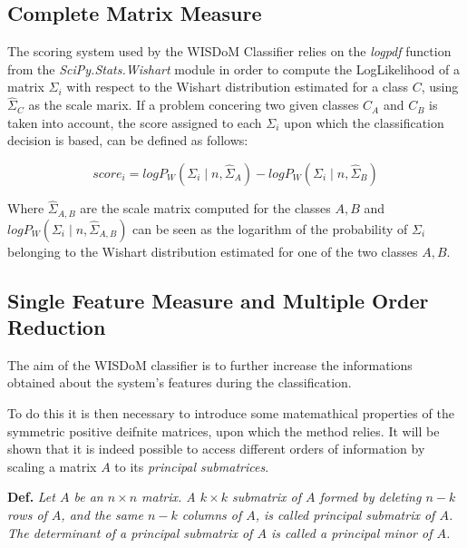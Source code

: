 \documentclass[12pt,openright,twoside,a4paper]{book}
\begin{document}
\subsection{Complete Matrix Measure}

The scoring system used by the WISDoM Classifier relies on the \textit{logpdf} function from the \textit{SciPy.Stats.Wishart} module in order to compute the LogLikelihood of a matrix $\Sigma_i$ with respect to the Wishart distribution estimated for a class $C$, using $\hat{\Sigma}_C$ as the scale marix.
If a problem concering two given classes $C_A$ and $C_B$ is taken into account, the score assigned to each $\Sigma_i$ upon which the classification decision is based, can be defined as follows:

\begin{equation}
score_{i}= logP_{W}(\Sigma_{i}\mid n, \hat{\Sigma}_{A})-logP_{W}(\Sigma_{i}\mid n,\hat{\Sigma}_{B})
\label{pdf-score}
\end{equation}

Where $\hat{\Sigma}_{A,B}$ are the scale matrix computed for the classes $A,B$ and $ logP_{W}(\Sigma_{i}\mid n, \hat{\Sigma}_{A,B})$ can be seen as the logarithm of the probability of $\Sigma_i$ belonging to the Wishart distribution estimated for one of the two classes $A,B$.

\subsection{Single Feature Measure and Multiple Order Reduction}

The aim of the WISDoM classifier is to further increase the informations obtained about the system's features during the classification.

To do this it is then necessary to introduce some matemathical properties of the symmetric positive deifnite matrices, upon which the method relies.
It will be shown that it is indeed possible to access different orders of information by scaling a matrix $A$ to its \textit{principal submatrices}.

\vspace{5mm}

\textbf{Def.} \textit{Let $A$ be an $n \times n$ matrix. A $k \times k$ submatrix of $A$ formed by deleting $n-k$ rows of $A$, and the same $n-k$ columns of $A$, is called principal submatrix of $A$. The determinant of a principal submatrix of $A$ is called a principal minor of $A$.}

\vspace{5mm}
\end{document}
